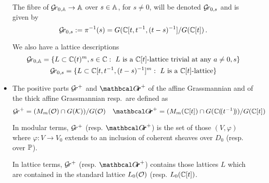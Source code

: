 \documentclass[draft]{article}
\begin{document}
\begin{itemize}
    The fibre of $\Grbd \to \AA$ over $ s \in \AA $, for $ s \ne 0$, will be denoted $ \Gr_{0,s} $ and is given by
    $$ 
    \Gr_{0,s} := \pi^{-1}(s) = G(\CC[t, t^{-1}, (t-s)^{-1}]/G(\CC[t])\,.
    $$
    
    We also have a lattice descriptions 
    \begin{gather*}
    \Grbd = 
    \{ L \subset  \CC(t)^m, s \in \CC : \text{ $L$ is a $\CC[t]$-lattice 
    trivial at any $ a \ne 0, s$} \} \\
     \Gr_{0,s} = 
    \{ L \subset  \CC[t,t^{-1},(t-s)^{-1}]^m : \text{ $L$ is a $\CC[t]$-lattice} \}
    \end{gather*}%
    \item The positive parts $ \Gr^+$ and ${\Grth}^+$ of the affine Grassmannian and of the thick affine Grassmannian resp.\ are defined as 
    $$
    \Gr^+ = (M_m(\cO) \cap G(\cK)) / G(\cO) \quad {\Grth}^+ = (M_m(\CC[t]) \cap G(\CC\xT[t^{-1}]) / G(\CC[t]) 
    $$

    In modular terms, $\Gr^+$ (resp. ${\Grth}^+$) is the set of those $ (V, \varphi)$ where $ \varphi : V \rightarrow V_0 $ extends to an inclusion of coherent sheaves over $ D_0 $ (resp. over $ \PP$).  
    
    In lattice terms, $ \Gr^+$ (resp. ${\Grth}^+$) contains those lattices $L$ which are contained in the standard 
    lattice $ L_0(\cO)$ (resp. $L_0(\CC[t])$. %
\end{itemize}
\end{document}
